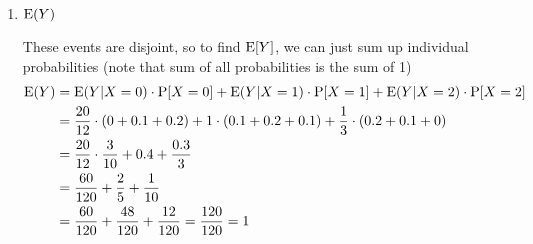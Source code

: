 \begin{enumerate}[label=(\alph*)]
\item $\text{E}(Y)$
\begin{solution}
These events are disjoint, so to find  $\text{E}[Y]$, we can just sum up 
individual probabilities (note that sum of all probabilities is the sum of 1)
\begin{equation}
\begin{split}
\text{E}(Y) &= \text{E}(Y|X=0) \cdot \text{P}[X=0] + \text{E}(Y|X=1) \cdot \text{P}[X=1] + \text{E}(Y|X=2) 
\cdot \text{P}[X=2] \\ \nonumber
         &= \frac{20}{12} \cdot (0 + 0.1 + 0.2) + 1 \cdot (0.1 + 0.2 + 0.1) 
         + \frac{1}{3} \cdot (0.2 + 0.1 + 0) \\
         &= \frac{20}{12} \cdot \frac{3}{10} + 0.4 + \frac{0.3}{3} \\
         &= \frac{60}{120} + \frac{2}{5} + \frac{1}{10} \\ 
         &= \frac{60}{120} + \frac{48}{120} + \frac{12}{120} = \frac{120}{120} = 1
\end{split}
\end{equation}
\end{solution}
\end{enumerate}